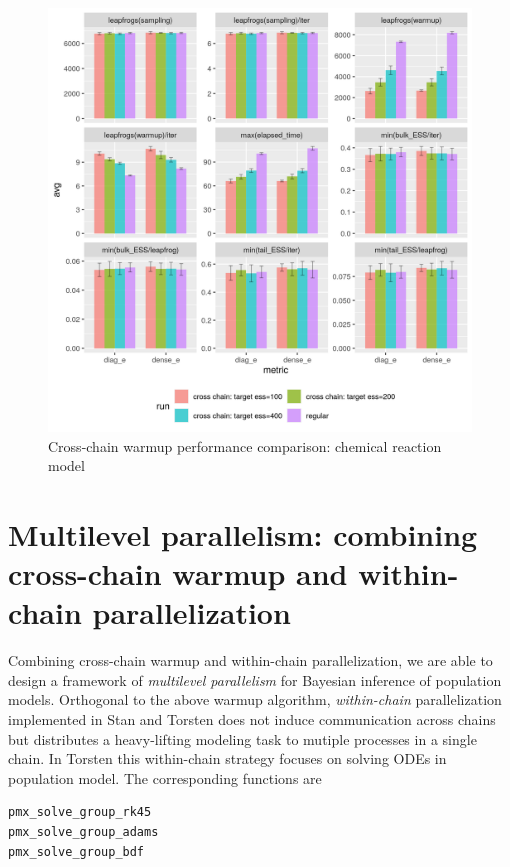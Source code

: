 \documentclass[11pt, reqno, oneside]{amsart}
\begin{document}
\begin{figure}[htbp]
\centering
\includegraphics[width=\textwidth]{./figure/cross_chain_ess_effect_chem.png}
\caption{Cross-chain warmup performance comparison: chemical reaction model}
\end{figure}


\section{Multilevel parallelism: combining cross-chain warmup and within-chain parallelization}
\label{sec:orgf72ae3d}
Combining cross-chain warmup and
within-chain parallelization, we are able to design a framework of
\emph{multilevel parallelism} for Bayesian inference of population
models. Orthogonal to the above warmup algorithm, \emph{within-chain}
parallelization implemented in Stan
and Torsten does not induce communication across chains but distributes a
heavy-lifting modeling task to mutiple processes in a single
chain. In Torsten this within-chain strategy focuses on solving ODEs
in population model. The corresponding functions are \cite{torsten_pmx_group}
\begin{verbatim}
pmx_solve_group_rk45
pmx_solve_group_adams
pmx_solve_group_bdf
\end{verbatim}
\end{document}
